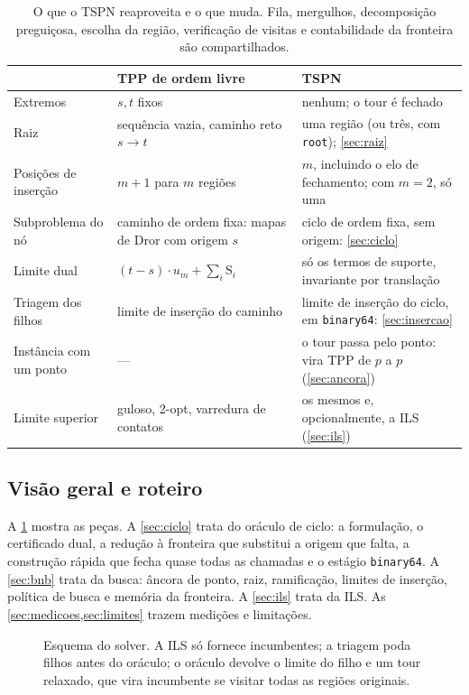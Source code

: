 \documentclass[11pt,a4paper]{article}
\theoremstyle{plain}\newtheorem{proposicao}{Proposição}
\theoremstyle{definition}\newtheorem{definicao}{Definição}
\theoremstyle{plain}\newtheorem{teorema}{Teorema}
\theoremstyle{plain}\newtheorem{lema}{Lema}
\newcommand{\code}[1]{\texttt{\small #1}}
\newcommand{\supp}{\mathrm{S}}
\begin{document}
\begin{table}[ht]\centering\small
\begin{tabular}{@{}>{\raggedright\arraybackslash}p{32mm}>{\raggedright\arraybackslash}p{50mm}>{\raggedright\arraybackslash}p{62mm}@{}}\toprule
& TPP de ordem livre & TSPN\\\midrule
Extremos & \(s,t\) fixos & nenhum; o tour é fechado\\
Raiz & sequência vazia, caminho reto \(s\to t\) & uma região (ou três, com \code{root}); \cref{sec:raiz}\\
Posições de inserção & \(m+1\) para \(m\) regiões & \(m\), incluindo o elo de fechamento; com \(m=2\), só uma\\
Subproblema do nó & caminho de ordem fixa: mapas de Dror com origem \(s\) & ciclo de ordem fixa, sem origem: \cref{sec:ciclo}\\
Limite dual & \((t-s)\cdot u_m+\sum_i\supp_i\) & só os termos de suporte, invariante por translação\\
Triagem dos filhos & limite de inserção do caminho & limite de inserção do ciclo, em \texttt{binary64}: \cref{sec:insercao}\\
Instância com um ponto & --- & o tour passa pelo ponto: vira TPP de \(p\) a \(p\) (\cref{sec:ancora})\\
Limite superior & guloso, 2-opt, varredura de contatos & os mesmos e, opcionalmente, a ILS (\cref{sec:ils})\\\bottomrule
\end{tabular}
\caption{O que o TSPN reaproveita e o que muda. Fila, mergulhos, decomposição preguiçosa, escolha da região, verificação de visitas e contabilidade da fronteira são compartilhados.}\label{tab:diferencas}
\end{table}

\subsection{Visão geral e roteiro}
A \cref{fig:visaogeral} mostra as peças. A \cref{sec:ciclo} trata do oráculo de ciclo: a formulação, o certificado dual, a redução à fronteira que substitui a origem que falta, a construção rápida que fecha quase todas as chamadas e o estágio \texttt{binary64}. A \cref{sec:bnb} trata da busca: âncora de ponto, raiz, ramificação, limites de inserção, política de busca e memória da fronteira. A \cref{sec:ils} trata da ILS. As \cref{sec:medicoes,sec:limites} trazem medições e limitações.

\begin{figure}[ht]\centering\figvisaogeral
\caption{Esquema do solver. A ILS só fornece incumbentes; a triagem poda filhos antes do oráculo; o oráculo devolve o limite do filho e um tour relaxado, que vira incumbente se visitar todas as regiões originais.}\label{fig:visaogeral}
\end{figure}
\end{document}
